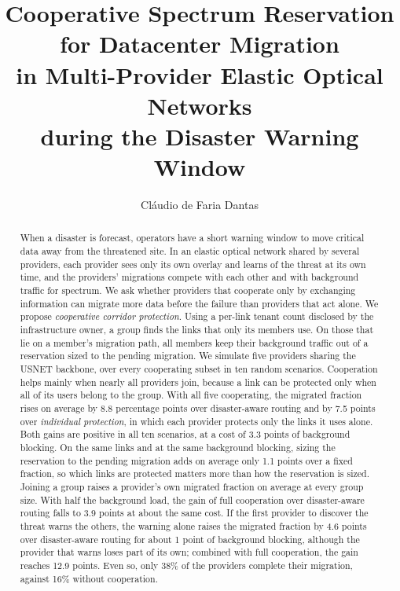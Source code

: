\documentclass[11pt,a4paper]{article}
\title{Cooperative Spectrum Reservation for Datacenter Migration\\
in Multi-Provider Elastic Optical Networks\\
during the Disaster Warning Window}
\author{Cláudio de Faria Dantas}
\date{}
\theoremstyle{definition}
\begin{document}
\maketitle

\begin{abstract}
When a disaster is forecast, operators have a short warning window to move critical data away from the threatened site.
In an elastic optical network shared by several providers, each provider sees only its own overlay and learns of the threat at its own time, and the providers' migrations compete with each other and with background traffic for spectrum.
We ask whether providers that cooperate only by exchanging information can migrate more data before the failure than providers that act alone.
We propose \emph{cooperative corridor protection}. Using a per-link tenant count disclosed by the infrastructure owner, a group finds the links that only its members use. On those that lie on a member's migration path, all members keep their background traffic out of a reservation sized to the pending migration.
We simulate five providers sharing the USNET backbone, over every cooperating subset in ten random scenarios.
Cooperation helps mainly when nearly all providers join, because a link can be protected only when all of its users belong to the group.
With all five cooperating, the migrated fraction rises on average by 8.8 percentage points over disaster-aware routing and by 7.5 points over \emph{individual protection}, in which each provider protects only the links it uses alone. Both gains are positive in all ten scenarios, at a cost of 3.3 points of background blocking.
On the same links and at the same background blocking, sizing the reservation to the pending migration adds on average only 1.1 points over a fixed fraction, so which links are protected matters more than how the reservation is sized.
Joining a group raises a provider's own migrated fraction on average at every group size.
With half the background load, the gain of full cooperation over disaster-aware routing falls to 3.9 points at about the same cost.
If the first provider to discover the threat warns the others, the warning alone raises the migrated fraction by 4.6 points over disaster-aware routing for about 1 point of background blocking, although the provider that warns loses part of its own; combined with full cooperation, the gain reaches 12.9 points.
Even so, only 38\% of the providers complete their migration, against 16\% without cooperation.
\end{abstract}
\end{document}
